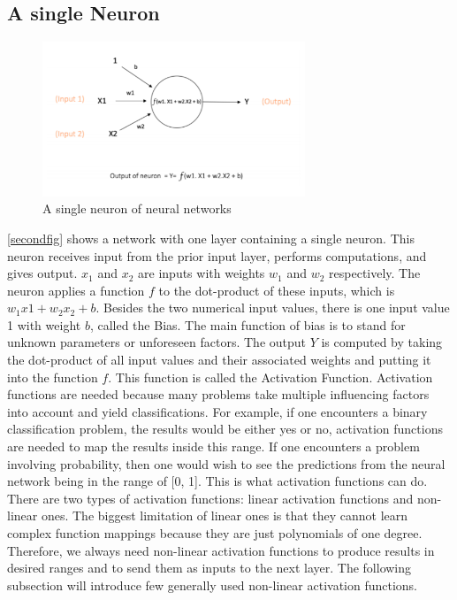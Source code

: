 \documentclass[a4paper,11pt,oneside]{book}
\begin{document}
\subsection{A single Neuron}
\begin{figure}[!h]
	\centering
	\includegraphics[width=0.7\textwidth]{figures/neuron}
	\caption{A single neuron of neural networks}
	\label{secondfig}
\end{figure}

\autoref{secondfig} shows a network with one layer containing a single neuron. This neuron receives input from the prior input layer, performs computations, and gives output. $x_1$ and $x_2$ are inputs with weights $w_1$ and $w_2$ respectively. The neuron applies a function $f$ to the dot-product of these inputs, which is $w_{1}x{1}+w_{2}x_{2}+b$.  Besides the two numerical input values, there is one input value 1 with weight $b$, called the Bias. The main function of bias is to stand for unknown parameters or unforeseen factors. The output $Y$ is computed by taking the dot-product of all input
values and their associated weights and putting it into the function $f$. This function is called the Activation Function.\newline\newline
Activation functions are needed because many problems take multiple influencing factors into account and yield classifications. For example, if one encounters a binary classification problem, the results would
be either yes or no, activation functions are needed to map the results
inside this range. If one encounters a problem involving probability, then
one would wish to see the predictions from the neural network being in
the range of [0, 1]. This is what activation functions can do.\newline\newline
There are two types of activation functions: linear activation
functions and non-linear ones. The biggest limitation of linear ones is
that they cannot learn complex function mappings because they are
just polynomials of one degree. Therefore, we always need non-linear
activation functions to produce results in desired ranges and to send
them as inputs to the next layer. The following subsection will introduce
few generally used non-linear activation functions.
\end{document}
